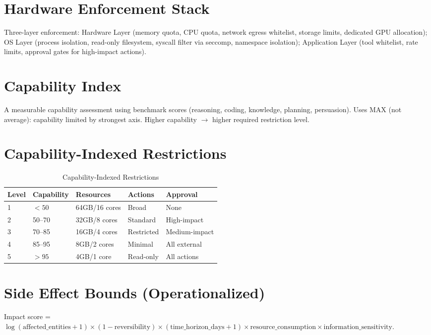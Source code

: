 \documentclass[11pt,letterpaper]{article}
\theoremstyle{definition}
\theoremstyle{remark}
\begin{document}
\section{Hardware Enforcement Stack}

Three-layer enforcement: Hardware Layer (memory quota, CPU quota, network egress whitelist, storage limits, dedicated GPU allocation); OS Layer (process isolation, read-only filesystem, syscall filter via seccomp, namespace isolation); Application Layer (tool whitelist, rate limits, approval gates for high-impact actions).

\section{Capability Index}

A measurable capability assessment using benchmark scores (reasoning, coding, knowledge, planning, persuasion). Uses MAX (not average): capability limited by strongest axis. Higher capability $\to$ higher required restriction level.

\section{Capability-Indexed Restrictions}

\begin{table}[h]
\centering
\begin{tabular}{@{}lllll@{}}
\toprule
\textbf{Level} & \textbf{Capability} & \textbf{Resources} & \textbf{Actions} & \textbf{Approval} \\
\midrule
1 & $<50$ & 64GB/16 cores & Broad & None \\
2 & 50--70 & 32GB/8 cores & Standard & High-impact \\
3 & 70--85 & 16GB/4 cores & Restricted & Medium-impact \\
4 & 85--95 & 8GB/2 cores & Minimal & All external \\
5 & $>95$ & 4GB/1 core & Read-only & All actions \\
\bottomrule
\end{tabular}
\caption{Capability-Indexed Restrictions}
\end{table}

\section{Side Effect Bounds (Operationalized)}

Impact score = $\log(\text{affected\_entities} + 1) \times (1 - \text{reversibility}) \times (\text{time\_horizon\_days} + 1) \times \text{resource\_consumption} \times \text{information\_sensitivity}$.
\end{document}
